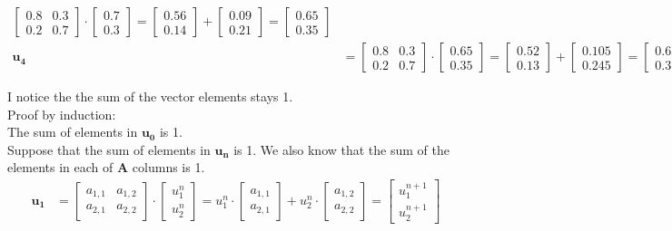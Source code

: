 \documentclass[a4paper,11pt]{article}
\newcommand{\mybf}[1]{\boldsymbol{#1}}
\begin{document}
\begin{subequations}
\begin{align}
\begin{bmatrix}
0.8 & 0.3\\
0.2 & 0.7
\end{bmatrix}
\cdot
\begin{bmatrix}
0.7  \\
0.3 
\end{bmatrix}
=
\begin{bmatrix}
0.56  \\
0.14 
\end{bmatrix}
+\begin{bmatrix}
0.09  \\
0.21 
\end{bmatrix}
=
\begin{bmatrix}
0.65  \\
0.35 
\end{bmatrix}
\\
\mybf{u_4}&=
\begin{bmatrix}
0.8 & 0.3\\
0.2 & 0.7
\end{bmatrix}
\cdot
\begin{bmatrix}
0.65  \\
0.35 
\end{bmatrix}
=
\begin{bmatrix}
0.52  \\
0.13 
\end{bmatrix}
+\begin{bmatrix}
0.105  \\
0.245 
\end{bmatrix}
=
\begin{bmatrix}
0.625  \\
0.375 
\end{bmatrix}
\end{align}
\end{subequations}

I notice the the sum of the vector elements stays 1.\\
Proof by induction:\\
The sum of elements in $\mybf{u_0}$ is 1.\\
Suppose that the sum of elements in $\mybf{u_n}$ is 1. 
We also know that the sum of the elements in each of $\mybf{A}$ columns is 1.
\begin{align}
\mybf{u_1}&=
\begin{bmatrix}
a_{1,1} & a_{1,2}\\
a_{2,1} & a_{2,2}
\end{bmatrix}
\cdot
\begin{bmatrix}
u^n_1  \\
u^n_2 
\end{bmatrix}
=
u^n_1
\cdot
\begin{bmatrix}
a_{1,1}  \\
a_{2,1}
\end{bmatrix}
+
u^n_2
\cdot
\begin{bmatrix}
a_{1,2}  \\
a_{2,2} 
\end{bmatrix}
=
\begin{bmatrix}
u^{n+1}_1  \\
u^{n+1}_2
\end{bmatrix}
\end{align}
\end{document}
